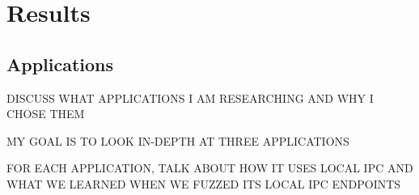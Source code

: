 \chapter{Results}
\label{sec:results}

\section{Applications}
\label{sec:applications}

DISCUSS WHAT APPLICATIONS I AM RESEARCHING AND WHY I CHOSE THEM

MY GOAL IS TO LOOK IN-DEPTH AT THREE APPLICATIONS

FOR EACH APPLICATION, TALK ABOUT HOW IT USES LOCAL IPC AND WHAT WE LEARNED WHEN WE FUZZED ITS LOCAL IPC ENDPOINTS